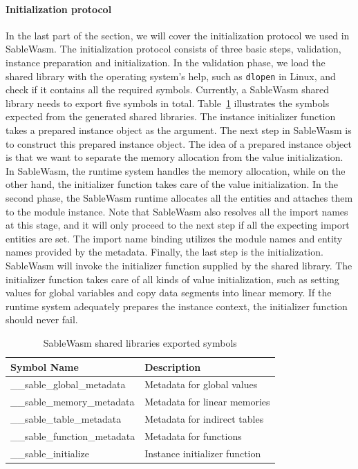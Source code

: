 \paragraph{Initialization protocol}
In the last part of the section, we will cover the initialization protocol we used in SableWasm. The initialization protocol consists of three basic steps, validation, instance preparation and initialization. In the validation phase, we load the shared library with the operating system's help, such as \texttt{dlopen} in Linux, and check if it contains all the required symbols. Currently, a SableWasm shared library needs to export five symbols in total. Table~\ref{tbl:sablewasm-runtime-export-syms} illustrates the symbols expected from the generated shared libraries. The instance initializer function takes a prepared instance object as the argument. The next step in SableWasm is to construct this prepared instance object. The idea of a prepared instance object is that we want to separate the memory allocation from the value initialization. In SableWasm, the runtime system handles the memory allocation, while on the other hand, the initializer function takes care of the value initialization. In the second phase, the SableWasm runtime allocates all the entities and attaches them to the module instance. Note that SableWasm also resolves all the import names at this stage, and it will only proceed to the next step if all the expecting import entities are set. The import name binding utilizes the module names and entity names provided by the metadata. Finally, the last step is the initialization. SableWasm will invoke the initializer function supplied by the shared library. The initializer function takes care of all kinds of value initialization, such as setting values for global variables and copy data segments into linear memory. If the runtime system adequately prepares the instance context, the initializer function should never fail.

\begin{table}[h]
    \centering
    \begin{tabular}{|l|l|}
        \hline
        \textbf{Symbol Name}          & \textbf{Description}          \\ \hline
        \_\_sable\_global\_metadata   & Metadata for global values    \\ \hline
        \_\_sable\_memory\_metadata   & Metadata for linear memories  \\ \hline
        \_\_sable\_table\_metadata    & Metadata for indirect tables  \\ \hline
        \_\_sable\_function\_metadata & Metadata for functions        \\ \hline
        \_\_sable\_initialize         & Instance initializer function \\ \hline
    \end{tabular}
    \caption{SableWasm shared libraries exported symbols}
    \label{tbl:sablewasm-runtime-export-syms}
\end{table}